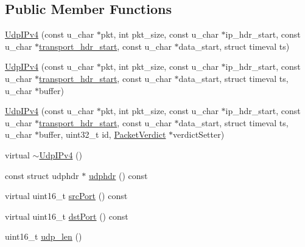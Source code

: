 \subsection*{Public Member Functions}
\begin{DoxyCompactItemize}
\item 
\hyperlink{class_vsid_common_1_1_udp_i_pv4_a4a1df97063fbdab432b9b3013b4c2ed9}{Udp\-I\-Pv4} (const u\-\_\-char $\ast$pkt, int pkt\-\_\-size, const u\-\_\-char $\ast$ip\-\_\-hdr\-\_\-start, const u\-\_\-char $\ast$\hyperlink{class_vsid_common_1_1_i_pv4_packet_a2318e0a0cc6d297eda5c4eb57682eb09}{transport\-\_\-hdr\-\_\-start}, const u\-\_\-char $\ast$data\-\_\-start, struct timeval ts)
\item 
\hyperlink{class_vsid_common_1_1_udp_i_pv4_af167e73fcec942795a477087f3476949}{Udp\-I\-Pv4} (const u\-\_\-char $\ast$pkt, int pkt\-\_\-size, const u\-\_\-char $\ast$ip\-\_\-hdr\-\_\-start, const u\-\_\-char $\ast$\hyperlink{class_vsid_common_1_1_i_pv4_packet_a2318e0a0cc6d297eda5c4eb57682eb09}{transport\-\_\-hdr\-\_\-start}, const u\-\_\-char $\ast$data\-\_\-start, struct timeval ts, u\-\_\-char $\ast$buffer)
\item 
\hyperlink{class_vsid_common_1_1_udp_i_pv4_a7e02f002ade8f186835b17bd805c04c6}{Udp\-I\-Pv4} (const u\-\_\-char $\ast$pkt, int pkt\-\_\-size, const u\-\_\-char $\ast$ip\-\_\-hdr\-\_\-start, const u\-\_\-char $\ast$\hyperlink{class_vsid_common_1_1_i_pv4_packet_a2318e0a0cc6d297eda5c4eb57682eb09}{transport\-\_\-hdr\-\_\-start}, const u\-\_\-char $\ast$data\-\_\-start, struct timeval ts, u\-\_\-char $\ast$buffer, uint32\-\_\-t id, \hyperlink{class_vsid_common_1_1_packet_verdict}{Packet\-Verdict} $\ast$verdict\-Setter)
\item 
virtual \hyperlink{class_vsid_common_1_1_udp_i_pv4_a96e32544472a123b68f3d8e7c111374c}{$\sim$\-Udp\-I\-Pv4} ()
\item 
const struct udphdr $\ast$ \hyperlink{class_vsid_common_1_1_udp_i_pv4_a2e347c8d856adf72c75ee01454ef7fc9}{udphdr} () const 
\item 
virtual uint16\-\_\-t \hyperlink{class_vsid_common_1_1_udp_i_pv4_ad76f80077e2e730ecffc141da5c6d5e4}{src\-Port} () const 
\item 
virtual uint16\-\_\-t \hyperlink{class_vsid_common_1_1_udp_i_pv4_acff278de2cb7c3103bc94163710f677d}{dst\-Port} () const 
\item 
uint16\-\_\-t \hyperlink{class_vsid_common_1_1_udp_i_pv4_a4fe5cf843e52b92c95fbd5098c13f14d}{udp\-\_\-len} ()
\end{DoxyCompactItemize}
